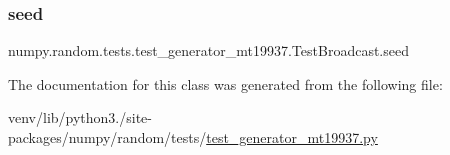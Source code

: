 \subsubsection{\texorpdfstring{seed}{seed}}
{\footnotesize\ttfamily numpy.\+random.\+tests.\+test\+\_\+generator\+\_\+mt19937.\+Test\+Broadcast.\+seed}



The documentation for this class was generated from the following file\+:\begin{DoxyCompactItemize}
\item 
venv/lib/python3./site-\/packages/numpy/random/tests/\hyperlink{test__generator__mt19937_8py}{test\+\_\+generator\+\_\+mt19937.\+py}\end{DoxyCompactItemize}
